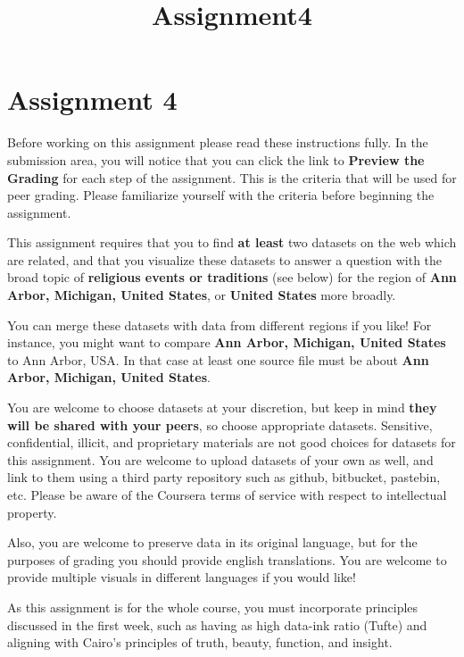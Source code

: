 \documentclass[11pt]{article}
\title{Assignment4}
\begin{document}
    
    
    \maketitle
    
    

    
    \section{Assignment 4}\label{assignment-4}

Before working on this assignment please read these instructions fully.
In the submission area, you will notice that you can click the link to
\textbf{Preview the Grading} for each step of the assignment. This is
the criteria that will be used for peer grading. Please familiarize
yourself with the criteria before beginning the assignment.

This assignment requires that you to find \textbf{at least} two datasets
on the web which are related, and that you visualize these datasets to
answer a question with the broad topic of \textbf{religious events or
traditions} (see below) for the region of \textbf{Ann Arbor, Michigan,
United States}, or \textbf{United States} more broadly.

You can merge these datasets with data from different regions if you
like! For instance, you might want to compare \textbf{Ann Arbor,
Michigan, United States} to Ann Arbor, USA. In that case at least one
source file must be about \textbf{Ann Arbor, Michigan, United States}.

You are welcome to choose datasets at your discretion, but keep in mind
\textbf{they will be shared with your peers}, so choose appropriate
datasets. Sensitive, confidential, illicit, and proprietary materials
are not good choices for datasets for this assignment. You are welcome
to upload datasets of your own as well, and link to them using a third
party repository such as github, bitbucket, pastebin, etc. Please be
aware of the Coursera terms of service with respect to intellectual
property.

Also, you are welcome to preserve data in its original language, but for
the purposes of grading you should provide english translations. You are
welcome to provide multiple visuals in different languages if you would
like!

As this assignment is for the whole course, you must incorporate
principles discussed in the first week, such as having as high data-ink
ratio (Tufte) and aligning with Cairo's principles of truth, beauty,
function, and insight.
\end{document}
